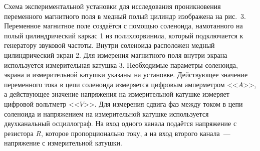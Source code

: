 \experiment
Схема экспериментальной установки для исследования проникновения переменного магнитного поля в медный полый цилиндр
изображена на рис.~3. Переменное магнитное поле создаётся с помощью соленоида, намотанного на полый цилиндрический каркас 1
из полихлорвинила, который подключается к генератору звуковой частоты. Внутри соленоида расположен медный цилиндрический
экран 2. Для измерения магнитного поля внутри экрана используется измерительная катушка 3. Необходимые параметры
соленоида, экрана и измерительной катушки указаны на установке. Действующее значение переменного тока в цепи соленоида
измеряется цифровым амперметром <<$A$>>, а действующее значение напряжения на измерительной катушке измеряет цифровой
вольтметр <<$V$>>. Для измерения сдвига фаз между током в цепи соленоида и напряжением на измерительной катушке
используется двухканальный осциллограф. На вход одного канала подаётся напряжение с резистора $R$, которое
пропорционально току, а на вход второго канала~--- напряжение с измерительной катушки.


